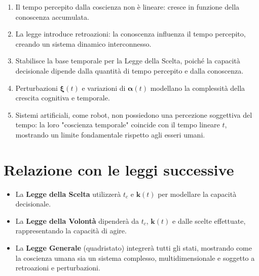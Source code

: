 \documentclass[12pt,a4paper]{article}
\begin{document}
\begin{enumerate}
    \item Il tempo percepito dalla coscienza non è lineare: cresce in funzione della conoscenza accumulata.
    \item La legge introduce retroazioni: la conoscenza influenza il tempo percepito, creando un sistema dinamico interconnesso.
    \item Stabilisce la base temporale per la Legge della Scelta, poiché la capacità decisionale dipende dalla quantità di tempo percepito e dalla conoscenza.
    \item Perturbazioni $\bm{\xi}(t)$ e variazioni di $\bm{\alpha}(t)$ modellano la complessità della crescita cognitiva e temporale.
    \item Sistemi artificiali, come robot, non possiedono una percezione soggettiva del tempo: la loro "coscienza temporale" coincide con il tempo lineare $t$, mostrando un limite fondamentale rispetto agli esseri umani.
\end{enumerate}

\section{Relazione con le leggi successive}

\begin{itemize}
    \item La \textbf{Legge della Scelta} utilizzerà $t_c$ e $\bm{k}(t)$ per modellare la capacità decisionale.
    \item La \textbf{Legge della Volontà} dipenderà da $t_c$, $\bm{k}(t)$ e dalle scelte effettuate, rappresentando la capacità di agire.
    \item La \textbf{Legge Generale} (quadristato) integrerà tutti gli stati, mostrando come la coscienza umana sia un sistema complesso, multidimensionale e soggetto a retroazioni e perturbazioni.
\end{itemize}
\end{document}
